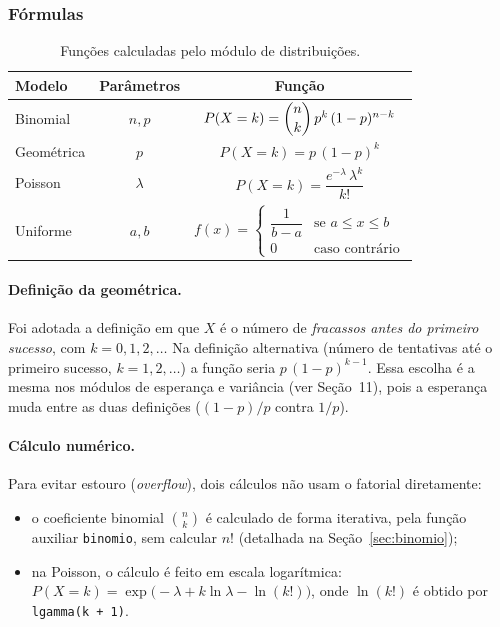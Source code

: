\documentclass[12pt,a4paper]{article}
\newcommand{\cod}[1]{\texttt{#1}}
\begin{document}
\subsubsection{Fórmulas}
\begin{table}[h]
\centering
\begin{tabular}{@{}lcc@{}}
\toprule
Modelo & Parâmetros & Função \\
\midrule
Binomial   & $n, p$      & $P(X = k) = \dbinom{n}{k}\,p^{k}\,(1-p)^{n-k}$ \\
Geométrica & $p$         & $P(X = k) = p\,(1-p)^{k}$ \\
Poisson    & $\lambda$   & $P(X = k) = \dfrac{e^{-\lambda}\,\lambda^{k}}{k!}$ \\
Uniforme   & $a, b$      & $f(x) = \begin{cases}
\dfrac{1}{b - a} & \text{se } a \le x \le b \\
0 & \text{caso contrário}
\end{cases}$ \\
\bottomrule
\end{tabular}
\caption{Funções calculadas pelo módulo de distribuições.}
\end{table}
 
\paragraph{Definição da geométrica.} Foi adotada a definição em que $X$ é o
número de \emph{fracassos antes do primeiro sucesso}, com $k = 0, 1, 2, \dots$
Na definição alternativa (número de tentativas até o primeiro sucesso,
$k = 1, 2, \dots$) a função seria $p\,(1-p)^{k-1}$. Essa escolha é a mesma nos módulos de esperança e variância
   (ver Seção~11), pois a esperança muda entre as duas definições
   ($(1-p)/p$ contra $1/p$).
 
\paragraph{Cálculo numérico.} Para evitar estouro (\emph{overflow}), dois
cálculos não usam o fatorial diretamente:
\begin{itemize}
  \item o coeficiente binomial $\binom{n}{k}$ é calculado de forma iterativa,
        pela função auxiliar \cod{binomio}, sem calcular $n!$
        (detalhada na Seção~\ref{sec:binomio});
  \item na Poisson, o cálculo é feito em escala logarítmica:
        $P(X = k) = \exp\bigl(-\lambda + k\ln\lambda - \ln(k!)\bigr)$,
        onde $\ln(k!)$ é obtido por \cod{lgamma(k + 1)}.
\end{itemize}
 
\end{document}
